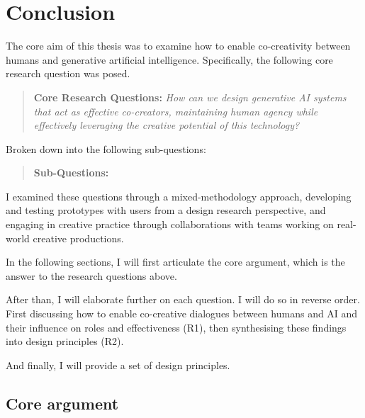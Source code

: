 \chapter[Conclusion]{Conclusion}\label{c:conclusion}

The core aim of this thesis was to examine how to enable co-creativity between humans and generative artificial intelligence. Specifically, the following core research question was posed. 

\begin{quote}
\textbf{Core Research Questions:}
\emph{How can we design generative AI systems that act as effective co-creators, maintaining human agency while effectively leveraging the creative potential of this technology?}
\end{quote}

Broken down into the following sub-questions: 

\begin{quote}
\textbf{Sub-Questions:}
\end{quote}


I examined these questions through a mixed-methodology approach, developing and testing prototypes with users from a design research perspective, and engaging in creative practice through collaborations with teams working on real-world creative productions.

In the following sections, I will first articulate the core argument, which is the answer to the research questions above. 

After than, I will elaborate further on each question. I will do so in reverse order. First discussing how to enable co-creative dialogues between humans and AI and their influence on roles and effectiveness (R1), then synthesising these findings into design principles (R2). 

And finally, I will provide a set of design principles. 

\section{Core argument}

